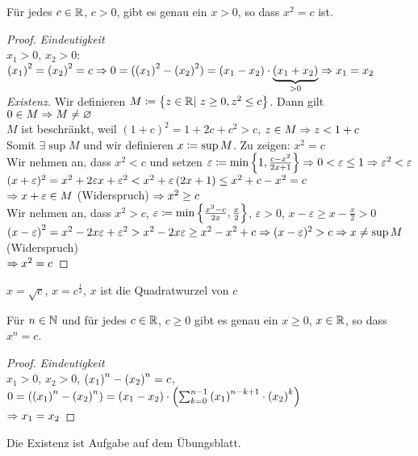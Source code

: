 \begin{satz}
    \marginnote{[16. Nov]}
    Für jedes $c\in\mathbb{R}$, $c>0$, gibt es genau ein $x>0$, so dass $x^2 = c$ ist.
    \begin{proof}
        \textit{Eindeutigkeit}\\
        $x_1>0$, $x_2>0$: $\left(x_1\right)^2 = \left(x_2\right)^2 = c \Rightarrow{} 0 = (\left(x_1\right)^2-\left(x_2\right)^2) = (x_1-x_2) \cdot \underbrace{(x_1+x_2)}_{>0} \Rightarrow{} x_1 = x_2$\\
        \textit{Existenz.} Wir definieren $M\coloneqq\left\{z\in\mathbb{R}|~z\geq 0, z^2 \leq c\right\}$. Dann gilt $0\in M \Rightarrow{} M\neq \varnothing$\\[10pt]
        $M$ ist beschränkt, weil $(1+c)^2=1+2c+c^2 > c$, \quad$z\in M \Rightarrow{} z < 1 + c$\\
        Somit $\exists \sup M$ und wir definieren $x\coloneqq \sup M$. Zu zeigen: $x^2 = c$\\[10pt]
        Wir nehmen an, dass $x^2<c$ und setzen $\varepsilon \coloneqq \min\left\{1, \frac{c-x^2}{2x+1}\right\} \Rightarrow{} 0 < \varepsilon \leq 1 \Rightarrow{} \varepsilon^2 < \varepsilon$\\
        $(x+\varepsilon)^2 = x^2 + 2\varepsilon x + \varepsilon^2 < x^2+\varepsilon\left(2x+1\right)\leq x^2+c-x^2=c$\\
        $\Rightarrow{} x+\varepsilon\in M$ (Widerspruch) $\Rightarrow{} x^2 \geq c$\\[10pt]
        Wir nehmen an, dass $x^2 > c$, $\varepsilon \coloneqq\min\left\{\frac{x^2-c}{2x}, \frac{x}{2}\right\}$, $\varepsilon > 0$, $x-\varepsilon \geq x-\frac{x}{2}>0$\\
        $\left(x-\varepsilon\right)^2 = x^2 - 2 x\varepsilon + \varepsilon^2 > x^2-2x\varepsilon \geq x^2-x^2+c\Rightarrow{} (x-\varepsilon)^2 > c \Rightarrow{} x\neq \sup M$ (Widerspruch)\\[10pt]
        $\Rightarrow{} x^2 = c$
    \end{proof}
\end{satz}

\begin{bemerkung}
    $x=\sqrt {c}$, $x=c^{\frac{1}{2}}$, $x$ ist die Quadratwurzel von $c$
\end{bemerkung}

\begin{satz}
    Für $n\in\mathbb{N}$ und für jedes $c\in\mathbb{R}$, $c\geq 0$ gibt es genau ein $x \geq 0$, $x\in\mathbb{R}$, so dass $x^n = c$.
    \begin{proof}
        \textit{Eindeutigkeit}\\
        $x_1>0$, $x_2>0$, $\left(x_1\right)^n-\left(x_2\right)^n = c$, $0=\left(\left(x_1\right)^n-\left(x_2\right)^n\right) = \left(x_1 - x_2\right)\cdot\left(\sum_{k=0}^{n-1} \left(x_1\right)^{n-k+1}\cdot \left(x_2\right)^k\right)$\\
        $\Rightarrow{} x_1 = x_2$
    \end{proof}
    \noindent Die Existenz ist Aufgabe auf dem Übungsblatt.
\end{satz}

